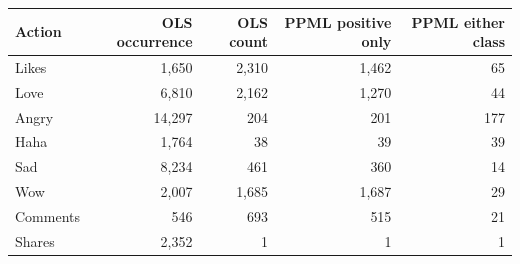 \begin{tabular}{lrrrr}
\toprule
Action & OLS occurrence & OLS count & PPML positive only & PPML either class \\
\midrule
Likes & 1,650 & 2,310 & 1,462 & 65 \\
Love & 6,810 & 2,162 & 1,270 & 44 \\
Angry & 14,297 & 204 & 201 & 177 \\
Haha & 1,764 & 38 & 39 & 39 \\
Sad & 8,234 & 461 & 360 & 14 \\
Wow & 2,007 & 1,685 & 1,687 & 29 \\
Comments & 546 & 693 & 515 & 21 \\
Shares & 2,352 & 1 & 1 & 1 \\
\bottomrule
\end{tabular}
